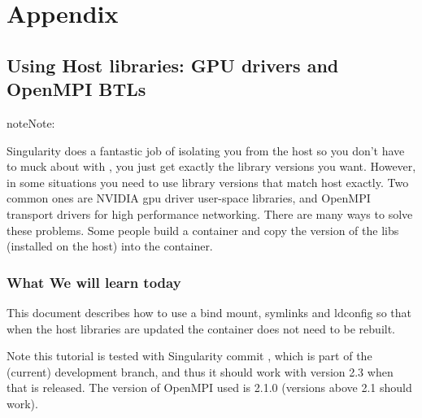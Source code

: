 \documentclass[letterpaper,10pt,english]{sphinxmanual}
\begin{document}
\chapter{Appendix}
\label{\detokenize{appendix:appendix}}\label{\detokenize{appendix::doc}}

\section{Using Host libraries: GPU drivers and OpenMPI BTLs}
\label{\detokenize{appendix:using-host-libraries-gpu-drivers-and-openmpi-btls}}\label{\detokenize{appendix:id1}}\label{\detokenize{appendix:sec-tutorial-gpu-drivers-and-openmpi}}
\begin{sphinxadmonition}{note}{Note:}
    
\end{sphinxadmonition}

Singularity does a fantastic job of isolating you from the host so you don’t have to muck
about with , you just get exactly the library versions you want. However,
in some situations you need to use library versions that match host exactly. Two common ones
are NVIDIA gpu driver user-space libraries, and OpenMPI transport drivers for high performance
networking. There are many ways to solve these problems. Some people build a container and copy
the version of the libs (installed on the host) into the container.


\subsection{What We will learn today}
\label{\detokenize{appendix:what-we-will-learn-today}}
This document describes how to use a bind mount, symlinks and ldconfig so that when the host
libraries are updated the container does not need to be rebuilt.

Note this tutorial is tested with Singularity commit ,
which is part of the (current) development branch, and thus it should work with version 2.3 when
that is released. The version of OpenMPI used is 2.1.0 (versions above 2.1 should work).
\end{document}
